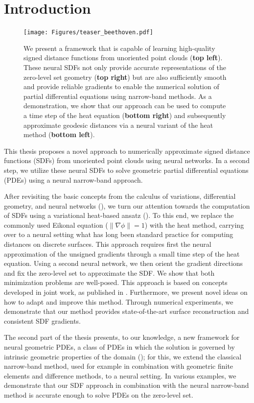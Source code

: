 \documentclass[12pt,openany]{book}
\theoremstyle{plainnormal}
\theoremstyle{remark}
\begin{document}
\section{Introduction}
\begin{figure}
    \centering
    \texttt{[image: Figures/teaser\_beethoven.pdf]}
    \caption{We present a framework that is capable of learning high-quality signed distance functions from unoriented point clouds (\textbf{top left}). These neural SDFs not only provide accurate representations of the zero-level set geometry (\textbf{top right}) but are also sufficiently smooth and provide reliable gradients to enable the numerical solution of partial differential equations using narrow-band methods. As a demonstration, we show that our approach can be used to compute a time step of the heat equation (\textbf{bottom right}) and subsequently approximate geodesic distances via a neural variant of the heat method (\textbf{bottom left}). }
    \label{teaser}
\end{figure}
This thesis proposes a novel approach to numerically approximate signed distance functions (SDFs) from unoriented point clouds using neural networks. In a second step, we utilize these neural SDFs to solve geometric partial differential equations (PDEs) using a neural narrow-band approach.\par
After revisiting the basic concepts from the calculus of variations, differential geometry, and neural networks (), we turn our attention towards the computation of SDFs using a variational heat-based ansatz (). To this end, we replace the commonly used Eikonal equation ($\|\nabla \phi\| = 1$) with the heat method, carrying over to a neural setting what has long been standard practice for computing distances on discrete surfaces. This approach requires first the neural approximation of the unsigned gradients through a small time step of the heat equation. Using a second neural network, we then orient the gradient directions and fix the zero-level set to approximate the SDF. We show that both minimization problems are well-posed. This approach is based on concepts developed in joint work, as published in \cite{weidemaier2025sdfsunorientedpointclouds}. Furthermore, we present novel ideas on how to adapt and improve this method. Through numerical experiments, we demonstrate that our method provides state-of-the-art surface reconstruction and consistent SDF gradients.\par
The second part of the thesis presents, to our knowledge, a new framework for neural geometric PDEs, a class of PDEs in which the solution is governed by intrinsic geometric properties of the domain (); for this, we extend the classical narrow-band method, used for example in combination with geometric finite elements and difference methods, to a neural setting. In various examples, we demonstrate that our SDF approach in combination with the neural narrow-band method is accurate enough to solve PDEs on the zero-level set.
\end{document}
